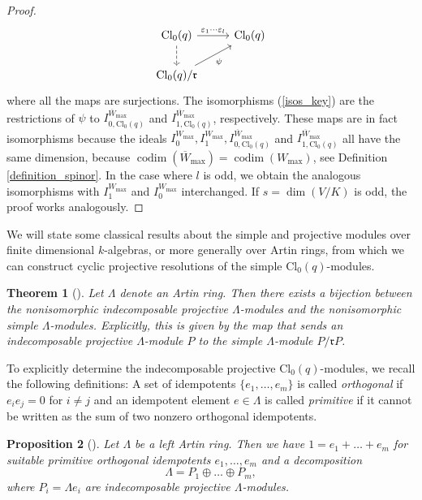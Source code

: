 \documentclass[a4paper, twoside, 11pt]{amsart}
\newtheorem{theorem}{Theorem}[section]
\newtheorem{proposition}[theorem]{Proposition}
\theoremstyle{definition}
\theoremstyle{remark}
\numberwithin{equation}{theorem}
\DeclareMathOperator{\codim}{codim}
\newcommand{\wmax}{W_{\text{max}}}
\newcommand{\evencl}{\mathrm{Cl}_0}
\begin{document}
\begin{proof}
\begin{equation*}
        \begin{tikzcd}
        \evencl(q) \arrow[r, "\varepsilon_1\cdots\varepsilon_l"] \arrow[d, dashed] & \evencl(q) \\
        \evencl(q)/\mathfrak{r} \arrow[ru, "\psi"']                                 &           
        \end{tikzcd}
    \end{equation*}
    where all the maps are surjections. The isomorphisms (\ref{isos_key}) are the restrictions of $\psi$ to $I_{0,\evencl(q)}^{\overline{W}_{\text{max}}}$ and $I_{1,\evencl(q)}^{\overline{W}_{\text{max}}}$, respectively. These maps are in fact isomorphisms because the ideals $I_0^{\wmax}, I_1^{\wmax}, I_{0,\evencl(q)}^{\overline{W}_{\text{max}}}$ and $I_{1,\evencl(q)}^{\overline{W}_{\text{max}}}$ all have the same dimension, because $\codim(\overline{W}_{\text{max}}) = \codim(\wmax)$, see Definition \ref{definition_spinor}.
    In the case where $l$ is odd, we obtain the analogous isomorphisms with $I_1^{\wmax}$ and $I_0^{\wmax}$ interchanged. If $s = \dim(V/K)$ is odd, the proof works analogously.
\end{proof}
We will state some classical results about the simple and projective modules over finite dimensional $k$-algebras, or more generally over Artin rings, from which we can construct cyclic projective resolutions of the simple $\evencl(q)$-modules.
\begin{theorem}[{\cite[§1.4.4, §1.4.5 ]{auslander}}]\label{correspondence}
    Let $\Lambda$ denote an Artin ring. Then there exists a bijection between the nonisomorphic indecomposable projective $\Lambda$-modules and the nonisomorphic simple $\Lambda$-modules. Explicitly, this is given by the map that sends an indecomposable projective $\Lambda$-module $P$ to the simple $\Lambda$-module $P/\mathfrak{r}P$.
\end{theorem}
To explicitly determine the indecomposable projective $\evencl(q)$-modules, we recall the following definitions: A set of idempotents $\{e_1,\dots,e_m\}$ is called \textit{orthogonal} if $e_ie_j = 0$ for $i \neq j$ and an idempotent element $e\in \Lambda$ is called \textit{primitive} if it cannot be written as the sum of two nonzero orthogonal idempotents. 
\begin{proposition}[{\cite[Ch.1, Proposition 4.8]{auslander}}]\label{projectives_decomp}
    Let $\Lambda$ be a left Artin ring. Then we have $1=e_1+\dots+e_m$ for suitable primitive orthogonal idempotents $e_1,\dots,e_m$ and a decomposition 
    \begin{equation*}
        \Lambda = P_1 \oplus \dots \oplus P_m,
    \end{equation*}
    where $P_i= \Lambda e_i$ are indecomposable projective $\Lambda$-modules. 
\end{proposition}
\end{document}

